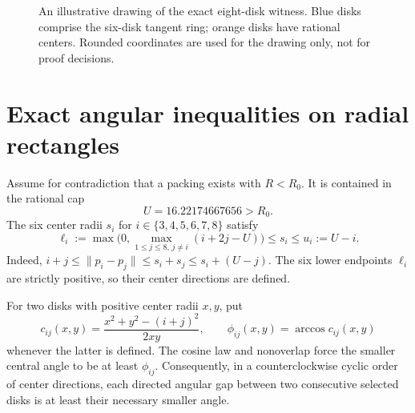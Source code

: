 \documentclass[10pt,a4paper]{article}
\newcommand{\Rcrit}{R_0}
\newcommand{\Rcap}{U}
\newcommand{\radii}{\{3,4,5,6,7,8\}}
\newcommand{\dist}[1]{\lVert #1\rVert}
\begin{document}
\begin{figure}[htbp]\centering
{}
\caption{An illustrative drawing of the exact eight-disk witness. Blue disks comprise the six-disk tangent ring; orange disks have rational centers. Rounded coordinates are used for the drawing only, not for proof decisions.}
\label{fig:packing}
\end{figure}

\section{Exact angular inequalities on radial rectangles}\label{sec:generic}
Assume for contradiction that a packing exists with $R<\Rcrit$. It is contained in the rational cap
\begin{equation}\label{eq:U}
 \Rcap=16.22174667656>\Rcrit.
\end{equation}
The six center radii $s_i$ for $i\in\radii$ satisfy
\begin{equation}\label{eq:box}
 \ell_i:=\max\bigl(0,\max_{1\le j\le8,\,j\ne i}(i+2j-\Rcap)\bigr)
 \le s_i\le u_i:=\Rcap-i.
\end{equation}
Indeed, $i+j\le\dist{p_i-p_j}\le s_i+s_j\le s_i+(\Rcap-j)$. The six lower endpoints $\ell_i$ are strictly positive, so their center directions are defined.

For two disks with positive center radii $x,y$, put
\begin{equation}\label{eq:cosphi}
 c_{ij}(x,y)=\frac{x^2+y^2-(i+j)^2}{2xy},\qquad
 \phi_{ij}(x,y)=\arccos c_{ij}(x,y)
\end{equation}
whenever the latter is defined. The cosine law and nonoverlap force the smaller central angle to be at least $\phi_{ij}$. Consequently, in a counterclockwise cyclic order of center directions, each directed angular gap between two consecutive selected disks is at least their necessary smaller angle.
\end{document}
